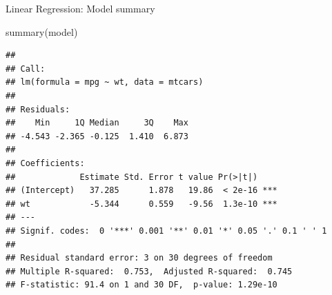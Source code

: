 \documentclass[9pt,ignorenonframetext,]{beamer}
\newenvironment{Shaded}{\begin{snugshade}}{\end{snugshade}}
\newcommand{\KeywordTok}[1]{\textcolor[rgb]{0.94,0.87,0.69}{#1}}
\newcommand{\NormalTok}[1]{\textcolor[rgb]{0.80,0.80,0.80}{#1}}
\begin{document}
\begin{frame}[fragile]{Linear Regression: Model summary}
\protect\hypertarget{linear-regression-model-summary}{}

\small

\begin{Shaded}
\begin{Highlighting}[]
\KeywordTok{summary}\NormalTok{(model)}
\end{Highlighting}
\end{Shaded}

\begin{verbatim}
## 
## Call:
## lm(formula = mpg ~ wt, data = mtcars)
## 
## Residuals:
##    Min     1Q Median     3Q    Max 
## -4.543 -2.365 -0.125  1.410  6.873 
## 
## Coefficients:
##             Estimate Std. Error t value Pr(>|t|)    
## (Intercept)   37.285      1.878   19.86  < 2e-16 ***
## wt            -5.344      0.559   -9.56  1.3e-10 ***
## ---
## Signif. codes:  0 '***' 0.001 '**' 0.01 '*' 0.05 '.' 0.1 ' ' 1
## 
## Residual standard error: 3 on 30 degrees of freedom
## Multiple R-squared:  0.753,  Adjusted R-squared:  0.745 
## F-statistic: 91.4 on 1 and 30 DF,  p-value: 1.29e-10
\end{verbatim}

\end{frame}
\end{document}
